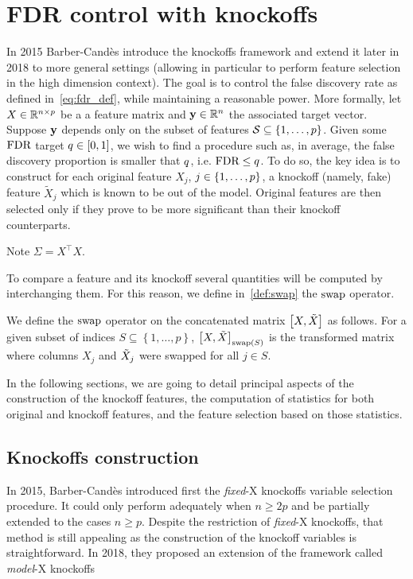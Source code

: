 \section{FDR control with knockoffs}\label{sec:knockoffs}

In 2015 Barber-Candès introduce the knockoffs framework and extend it later in 2018 to more general settings
(allowing in particular to perform feature selection in the high dimension context).
The goal is to control the false discovery rate as defined in~\ref{eq:fdr_def}, while maintaining a reasonable power.
More formally, let $X \in \mathbb{R}^{n \times p}$ be a a feature matrix and $\mathbf{y} \in \mathbb{R}^n$ the associated target vector.
Suppose $\mathbf{y}$ depends only on the subset of features $\mathcal{S} \subseteq \left\{ 1, \dots, p \right\}$.
Given some $\text{FDR}$ target $q \in [0, 1]$, we wish to find a procedure such as, in average,
the false discovery proportion is smaller that $q$, i.e. $\text{FDR} \leq q$.
To do so, the key idea is to construct for each original feature $X_j$, $j \in \left\{ 1, \dots, p \right\}$,
a knockoff (namely, fake) feature $\tilde{X}_j$ which is known to be out of the model.
Original features are then selected only if they prove to be more significant than their knockoff counterparts.

Note $\Sigma = X^\top X$.

To compare a feature and its knockoff several quantities will be computed by interchanging them.
For this reason, we define in~\ref{def:swap} the $\operatorname{swap}$ operator.
\begin{definition}\label{def:swap}
        We define the $\operatorname{swap}$ operator on the concatenated matrix $\big[ X, \tilde{X} \big]$ as follows.
        For a given subset of indices $S \subseteq \left\{ 1, \dots, p \right\}$,
        $\big[ X, \tilde{X} \big]_{\operatorname{swap}(S)}$ is the transformed matrix where columns $X_j$ and $\tilde{X}_j$ were swapped for all
        $j \in S$.
\end{definition}

In the following sections, we are going to detail principal aspects of the construction of the knockoff features,
the computation of statistics for both original and knockoff features,
and the feature selection based on those statistics.
%
\subsection{Knockoffs construction}\label{subsec:kc}

In 2015, Barber-Candès introduced first the \textit{fixed}-X knockoffs variable selection procedure.
It could only perform adequately when $n \geq 2p$ and be partially extended to the cases $n \geq p$.
Despite the restriction of \textit{fixed}-X knockoffs, that method is still appealing as the construction of the
knockoff variables is straightforward.
In 2018, they proposed an extension of the framework called \textit{model}-X knockoffs

